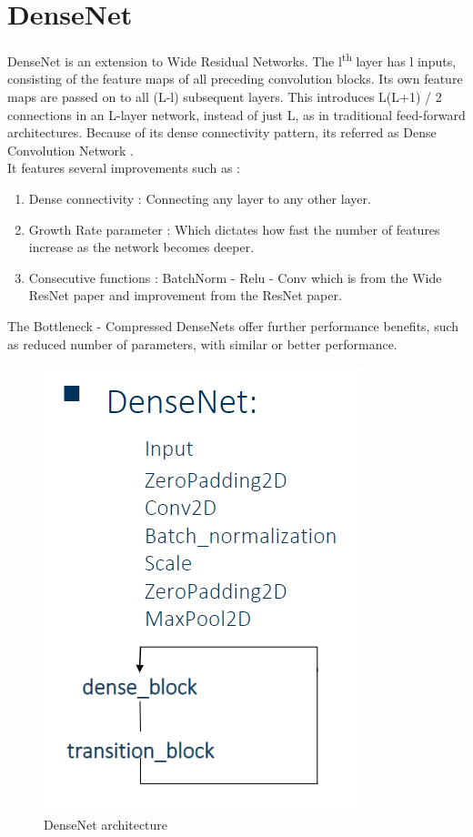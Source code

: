 \documentclass[a4paper,19pt]{article}
\begin{document}
\section{DenseNet}
DenseNet is an extension to Wide Residual Networks. The l\textsuperscript{th} layer has l inputs, consisting of the feature maps of all preceding convolution blocks. Its own feature maps are passed on to all (L-l) subsequent layers. This introduces L(L+1) / 2 connections in an L-layer network, instead of just L, as in traditional feed-forward architectures. Because of its dense connectivity pattern, its referred as Dense Convolution Network \cite{DBLP:journals/corr/HuangLW16a}.
\\It features several improvements such as :

\begin{enumerate}
    \item Dense connectivity : Connecting any layer to any other layer.
    \item Growth Rate parameter : Which dictates how fast the number of features increase as the network becomes deeper.
    \item Consecutive functions : BatchNorm - Relu - Conv which is from the Wide ResNet paper and improvement from the ResNet paper.
\end{enumerate}
The Bottleneck - Compressed DenseNets offer further performance benefits, such as reduced number of parameters, with similar or better performance.

\begin{figure}[h!]
\centering
\includegraphics[scale=0.7]{images/densenet.PNG}
\caption{DenseNet architecture \textsuperscript{\cite{DBLP:journals/corr/HuangLW16a}}}
\label{fig:Densenet}
\end{figure}
\end{document}
